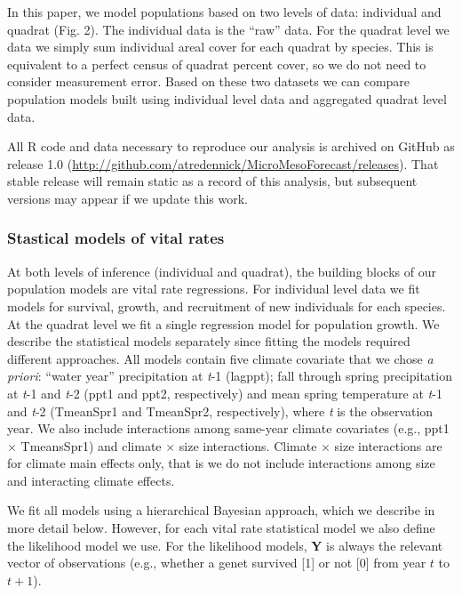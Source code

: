 \documentclass[12pt,]{article}
\begin{document}
In this paper, we model populations based on two levels of data:
individual and quadrat (Fig. 2). The individual data is the ``raw''
data. For the quadrat level we data we simply sum individual areal cover
for each quadrat by species. This is equivalent to a perfect census of
quadrat percent cover, so we do not need to consider measurement error.
Based on these two datasets we can compare population models built using
individual level data and aggregated quadrat level data.

All R code and data necessary to reproduce our analysis is archived on
GitHub as release 1.0
(\url{http://github.com/atredennick/MicroMesoForecast/releases}). That
stable release will remain static as a record of this analysis, but
subsequent versions may appear if we update this work.

\subsubsection{Stastical models of vital
rates}\label{stastical-models-of-vital-rates}

At both levels of inference (individual and quadrat), the building
blocks of our population models are vital rate regressions. For
individual level data we fit models for survival, growth, and
recruitment of new individuals for each species. At the quadrat level we
fit a single regression model for population growth. We describe the
statistical models separately since fitting the models required
different approaches. All models contain five climate covariate that we
chose \emph{a priori}: ``water year'' precipitation at \emph{t}-1
(lagppt); fall through spring precipitation at \emph{t}-1 and \emph{t}-2
(ppt1 and ppt2, respectively) and mean spring temperature at \emph{t}-1
and \emph{t}-2 (TmeanSpr1 and TmeanSpr2, respectively), where \emph{t}
is the observation year. We also include interactions among same-year
climate covariates (e.g., ppt1 $\times$ TmeansSpr1) and climate $\times$
size interactions. Climate $\times$ size interactions are for climate
main effects only, that is we do not include interactions among size and
interacting climate effects.

We fit all models using a hierarchical Bayesian approach, which we
describe in more detail below. However, for each vital rate statistical
model we also define the likelihood model we use. For the likelihood
models, \textbf{Y} is always the relevant vector of observations (e.g.,
whether a genet survived {[}1{]} or not {[}0{]} from year $t$ to $t+1$).
\end{document}
